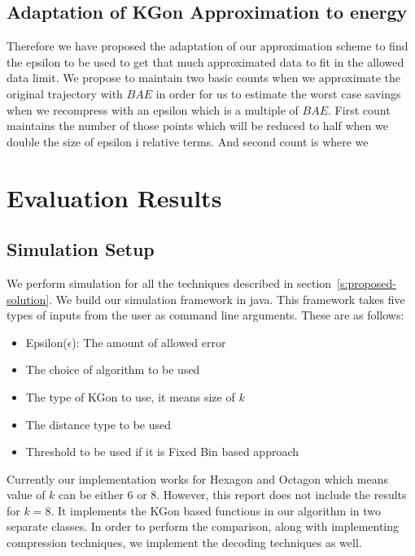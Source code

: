 \documentclass[conference]{IEEEtran}
\begin{document}
\subsection{Adaptation of KGon Approximation to energy}
 
Therefore we have proposed the adaptation of our approximation scheme to find the epsilon to be used to get that much 
approximated data to fit in the allowed data limit. We propose to maintain two basic counts when we approximate the original 
trajectory with $BAE$ in order for us to estimate the worst case savings when we recompress with an epsilon which is a multiple 
of $BAE$. First count maintains the number of those points which will be reduced to half when we double the size of epsilon i 
relative terms. And second count is where we 
 
 \section{Evaluation Results}
 \subsection{Simulation Setup}\label{sec:simulation}
 We perform simulation for all the techniques described in section~\ref{s:proposed-solution}. We build our simulation framework 
 in java. This framework takes five types of inputs from the user as command line arguments. These are as follows:

 \begin{itemize}
 \item Epsilon($\epsilon$): The amount of allowed error
 \item The choice of algorithm to be used
 \item The type of KGon to use, it means size of $k$
 \item The distance type to be used
 \item Threshold to be used if it is Fixed Bin based approach
 \end{itemize}
 
 Currently our implementation works for Hexagon and Octagon which means value of $k$ can be either 6 or 8. However, 
 this report does not include the results for $k = 8$. It implements the KGon based functions in our algorithm in two separate 
 classes. In order to perform the comparison, along with implementing compression techniques, we implement the decoding 
 techniques as well. \\
 
\end{document}
